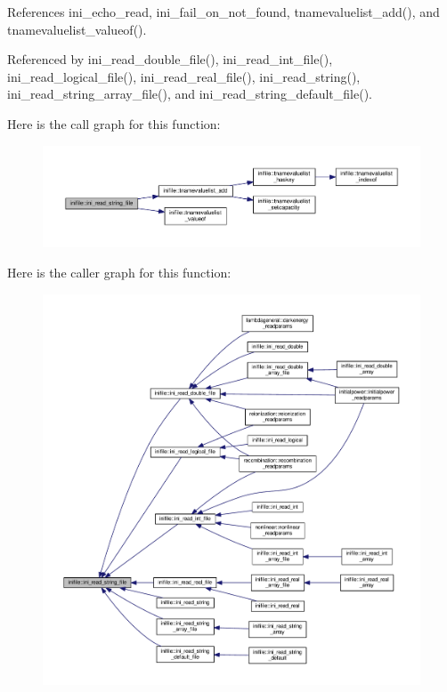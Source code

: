 References ini\+\_\+echo\+\_\+read, ini\+\_\+fail\+\_\+on\+\_\+not\+\_\+found, tnamevaluelist\+\_\+add(), and tnamevaluelist\+\_\+valueof().



Referenced by ini\+\_\+read\+\_\+double\+\_\+file(), ini\+\_\+read\+\_\+int\+\_\+file(), ini\+\_\+read\+\_\+logical\+\_\+file(), ini\+\_\+read\+\_\+real\+\_\+file(), ini\+\_\+read\+\_\+string(), ini\+\_\+read\+\_\+string\+\_\+array\+\_\+file(), and ini\+\_\+read\+\_\+string\+\_\+default\+\_\+file().

Here is the call graph for this function\+:
\nopagebreak
\begin{figure}[H]
\begin{center}
\leavevmode
\includegraphics[width=350pt]{namespaceinifile_a83d64e9da5ab1119c623d180ebefa77f_cgraph}
\end{center}
\end{figure}
Here is the caller graph for this function\+:
\nopagebreak
\begin{figure}[H]
\begin{center}
\leavevmode
\includegraphics[width=350pt]{namespaceinifile_a83d64e9da5ab1119c623d180ebefa77f_icgraph}
\end{center}
\end{figure}
\mbox{\label{namespaceinifile_a49bf986c5eea73c39bf9c4168143e81b}} 
